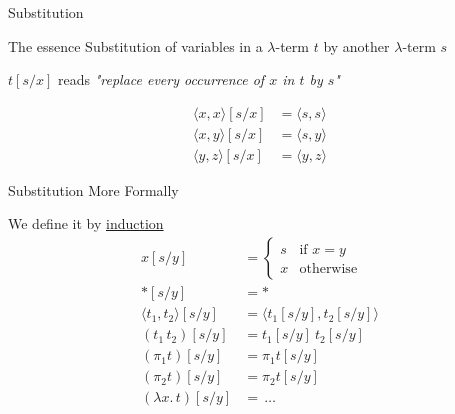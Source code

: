 \documentclass{beamer}
\def\pv#1#2{\langle #1 \rangle #2}
\begin{document}
\begin{frame}{Substitution}
        \begin{block}{The essence}
                Substitution of variables in a  $\lambda$-term $t$ by another
                $\lambda$-term $s$
        \end{block}

        $t[s/x]$ reads \emph{"replace every occurrence of $x$ in $t$ by $s$"}

        \pause
        \bigskip
        \begin{example}
                \vspace{-0.5cm}
                \begin{align*}
                        \pv{x,x}[s/x] & = \pv{s,s}
                        \\
                        \pv{x,y}[s/x] & = \pv{s,y}
                        \\
                        \pv{y,z}[s/x] & = \pv{y,z}
                \end{align*}
                \vspace{-0.7cm}
        \end{example}
\end{frame}

\begin{frame}{Substitution More Formally}

        We define it by \alert{\underline{induction}}
        \begin{align*}
                x[s/y] & = 
                \begin{cases}
                        s & \text{if } x = y \\
                        x & \text{otherwise}
                \end{cases}
                \\
                \ast[s/y] & = \ast
                \\
                \pv{t_1,t_2}[s/y] & = \pv{t_1[s/y], t_2[s/y]}
                \\
                (t_1 \, t_2)[s/y] & = t_1[s/y] \> t_2[s/y]
                \\
                (\pi_1 t)[s/y] & = \pi_1 t[s/y] 
                \\
                (\pi_2 t)[s/y] & = \pi_2 t[s/y] 
                \\
                (\lambda x. \, t)[s/y] & = \, \dots
        \end{align*}
\end{frame}
\end{document}
